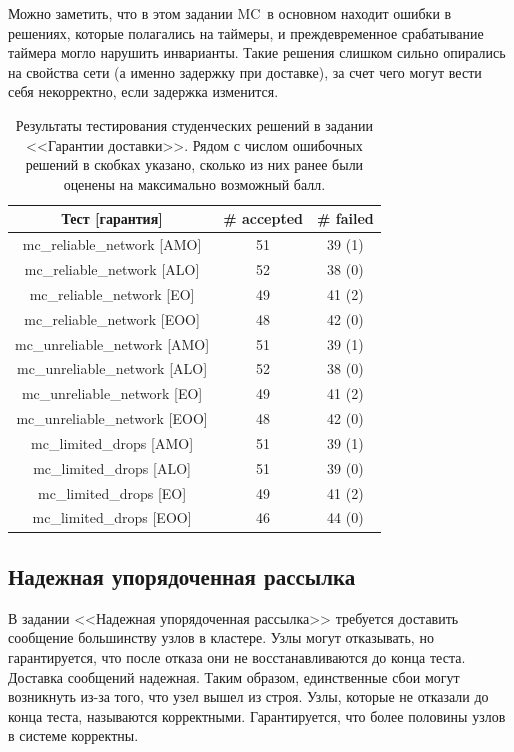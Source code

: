 \documentclass[a4paper,12pt]{extarticle}
\newcommand{\mc}[0]{MC}
\begin{document}
Можно заметить, что в этом задании \mc\ в основном находит ошибки в решениях, которые полагались на таймеры, и преждевременное срабатывание таймера могло нарушить инварианты.
Такие решения слишком сильно опирались на свойства сети (а именно задержку при доставке), за счет чего могут вести себя некорректно, если задержка изменится.

\begin{table}[htbp]
    \caption{Результаты тестирования студенческих решений в задании <<Гарантии доставки>>. Рядом с числом ошибочных решений в скобках указано, сколько из них ранее были оценены на максимально возможный балл. }
    \begin{center}
    \begin{tabular}{|c|c|c|}
    \hline
    \textbf{Тест [гарантия]} & \textbf{\# accepted} & \textbf{\# failed}  \\
    \hline
    mc\_reliable\_network [AMO]  & 51 & 39 (1) \\
    mc\_reliable\_network [ALO] & 52 & 38 (0) \\
    mc\_reliable\_network [EO] & 49 & 41 (2) \\
    mc\_reliable\_network [EOO] & 48 & 42 (0) \\
    \hline
    mc\_unreliable\_network [AMO] & 51 & 39 (1) \\
    mc\_unreliable\_network [ALO] & 52 & 38 (0) \\
    mc\_unreliable\_network [EO] & 49 & 41 (2) \\
    mc\_unreliable\_network [EOO] & 48 & 42 (0) \\
    \hline
    mc\_limited\_drops [AMO] & 51 &  39 (1) \\
    mc\_limited\_drops [ALO] & 51 &  39 (0) \\
    mc\_limited\_drops [EO] & 49 &  41 (2)\\
    mc\_limited\_drops [EOO] & 46 &  44 (0)\\
    \hline

    \end{tabular}
    \label{tab5}
    \end{center}
\end{table}

\subsection{Надежная упорядоченная рассылка}
\label{BROADCAST}
В задании <<Надежная упорядоченная рассылка>> \cite{b14} требуется доставить сообщение большинству узлов в кластере.
Узлы могут отказывать, но гарантируется, что после отказа они не восстанавливаются до конца теста.
Доставка сообщений надежная.
Таким образом, единственные сбои могут возникнуть из-за того, что узел вышел из строя.
Узлы, которые не отказали до конца теста, называются корректными.
Гарантируется, что более половины узлов в системе корректны.
\end{document}
